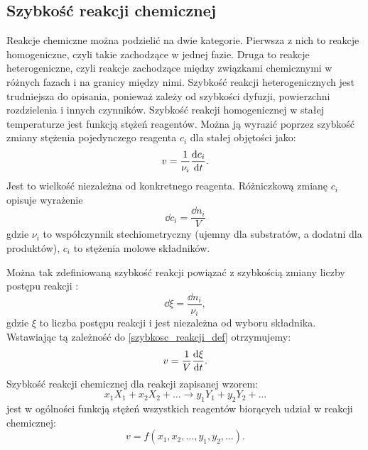 \documentclass[10pt, a4paper, twoside, onecolumn]{article}
\numberwithin{equation}{section}
\begin{document}
	\subsection{Szybkość reakcji chemicznej}
	Reakcje chemiczne można podzielić na dwie kategorie. Pierwsza z nich to reakcje homogeniczne, czyli takie zachodzące w jednej fazie. Druga to reakcje heterogeniczne, czyli reakcje zachodzące między związkami chemicznymi w różnych fazach i na granicy między nimi. Szybkość reakcji heterogenicznych jest trudniejsza do opisania, ponieważ zależy od szybkości dyfuzji, powierzchni rozdzielenia i innych czynników. %
	Szybkość reakcji homogenicznej w stałej temperaturze jest funkcją stężeń reagentów. Można ją wyrazić poprzez szybkość zmiany stężenia pojedynczego reagenta $c_{i}$ dla stałej objętości jako: 
	\begin{equation}\label{szybkosc_reakcji_def}
		v=\frac{1}{\nu_i}\dv{c_i}{t}.
	\end{equation}
	Jest to wielkość niezależna od konkretnego reagenta. Różniczkową zmianę $c_{i}$ opisuje wyrażenie
	\begin{equation}
		\dd{c_{i}}=\frac{\dd{n_{i}}}{V}
	\end{equation}
	gdzie \(\nu_{i}\) to współczynnik stechiometryczny (ujemny dla substratów, a dodatni dla produktów), \(c_{i}\) to stężenia molowe składników. \par
	Można tak zdefiniowaną szybkość reakcji powiązać z szybkością zmiany liczby postępu reakcji \cite{atkins_por}:
	\begin{equation}
		\dd{\xi}=\frac{\dd{n_{i}}}{\nu_{i}},
	\end{equation}
	gdzie \(\xi\) to liczba postępu reakcji i jest niezależna od wyboru składnika. Wstawiając tą zależność do \eqref{szybkosc_reakcji_def} otrzymujemy: 
	\begin{equation}
		v=\frac{1}{V}\dv{\xi}{t}.
	\end{equation}
	Szybkość reakcji chemicznej dla reakcji zapisanej wzorem:
	\begin{equation*}
		x_{1}X_{1}+x_{2}X_{2}+\ldots \rightarrow y_{1}Y_{1}+y_{2}Y_{2}+\ldots
	\end{equation*}
	jest w ogólności funkcją stężeń wszystkich reagentów biorących udział w reakcji chemicznej: 
	\begin{equation*}
		v=f\left(x_{1}, x_{2}, \ldots, y_{1}, y_{2}, \ldots\right).
	\end{equation*}
\end{document}
